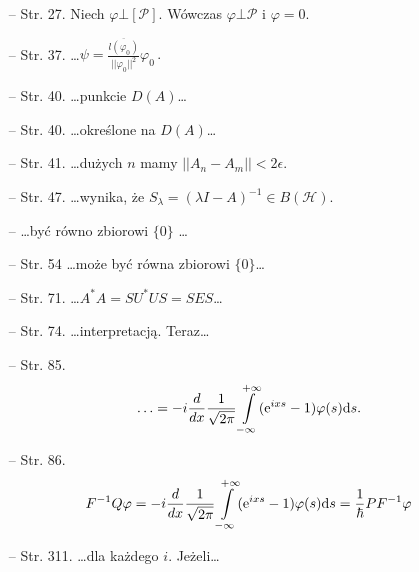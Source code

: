 \documentclass[a4paper,11pt]{article}
\begin{document}
\begin{itemize}
\item[--] Str. 27. Niech $\varphi \bot [ \mathcal{ P } ]$. Wówczas
  $\varphi \bot \mathcal{ P }$ i $\varphi = 0$.
\item[--] Str. 37.
  \ldots$\psi = \frac{ \overline{ l ( \varphi_{ 0 } ) } }{ ||
    \varphi_{ 0 } ||^{ 2 } } \varphi_{ 0 } \, .$
\item[--] Str. 40. \ldots punkcie $D( A )$\ldots
\item[--] Str. 40. \ldots określone na $D( A )$\ldots
\item[--] Str. 41. \ldots dużych $n$ mamy
  $|| A_{ n } - A_{ m } || < 2 \epsilon$.
\item[--] Str. 47. \ldots wynika, że
  $S_{ \lambda } = ( \lambda I - A )^{ -1 } \in B( \mathcal{ H } )$.
\item[--] \ldots być równo zbiorowi $\{ 0 \}$ \ldots
\item[--] Str. 54 \ldots może być równa zbiorowi $\{ 0 \}$\ldots
\item[--] Str. 71. \ldots$A^{ * } A = S U^{ * } U S = S E S$\ldots
\item[--] Str. 74. \ldots interpretacją. Teraz\ldots
\item[--] Str. 85.
  $$\ldots = -i \frac{ d }{ dx } \frac{ 1 }{ \sqrt{ 2 \pi } }
  \int\limits_{ -\infty }^{ +\infty } ( \mathrm{e}^{ i x s } - 1 ) \varphi( s ) \mathrm{d} s \textrm{.}$$
\item[--] Str. 86.
  $$F^{ -1 } Q \varphi = -i \frac{ d }{ dx } \frac{ 1 }{ \sqrt{ 2 \pi }
  } \int\limits_{ -\infty }^{ +\infty } ( \mathrm{e}^{ i x s } - 1 )
  \varphi( s ) \mathrm{d} s = \frac{ 1 }{ \hbar } P F^{ -1 } \varphi$$
\item[--] Str. 311. \ldots dla każdego $i$. Jeżeli\ldots
\end{itemize}



\end{document}
